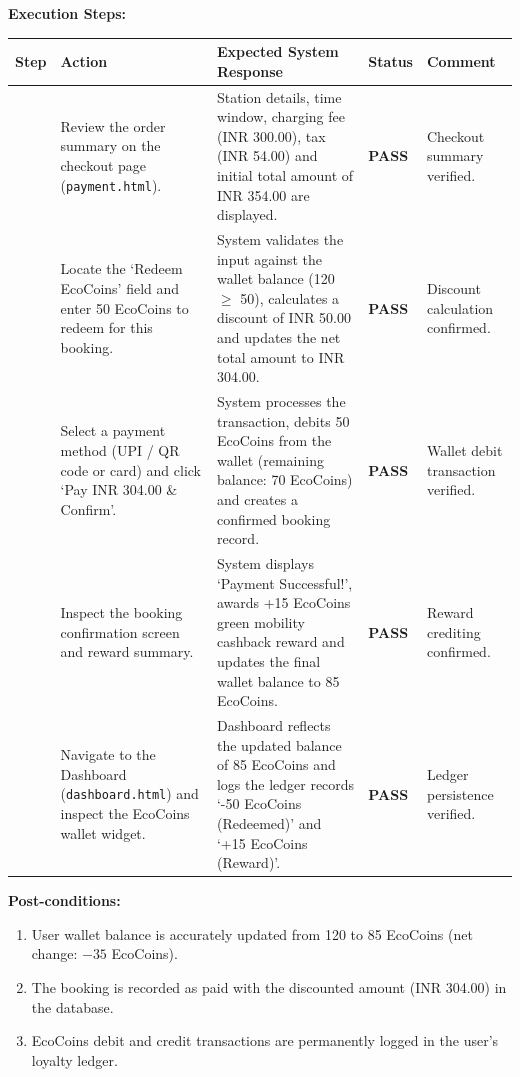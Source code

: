 \documentclass{tietreport}
\begin{document}
\vspace{-0.4em}
\noindent\textbf{Execution Steps:}
\begin{center}
\footnotesize
\renewcommand{\arraystretch}{1.02}
\setlength{\tabcolsep}{3pt}\begin{tabularx}{\textwidth}{|>{\centering\arraybackslash}p{0.9cm}|>{\raggedright\arraybackslash}p{3.3cm}|>{\raggedright\arraybackslash}X|>{\centering\arraybackslash}p{1.1cm}|>{\centering\arraybackslash\scriptsize}p{2.3cm}|}
\hline
\textbf{Step} & \textbf{Action} & \textbf{Expected System Response} & \textbf{Status} & \textbf{Comment} \\
\hline
1 & Review the order summary on the checkout page (\texttt{payment.html}). & Station details, time window, charging fee (INR 300.00), tax (INR 54.00) and initial total amount of INR 354.00 are displayed. & \textbf{PASS} & {\scriptsize Checkout summary verified.} \\
\hline
2 & Locate the `Redeem EcoCoins' field and enter 50 EcoCoins to redeem for this booking. & System validates the input against the wallet balance (120 $\geq$ 50), calculates a discount of INR 50.00 and updates the net total amount to INR 304.00. & \textbf{PASS} & {\scriptsize Discount calculation confirmed.} \\
\hline
3 & Select a payment method (UPI / QR code or card) and click `Pay INR 304.00 \& Confirm'. & System processes the transaction, debits 50 EcoCoins from the wallet (remaining balance: 70 EcoCoins) and creates a confirmed booking record. & \textbf{PASS} & {\scriptsize Wallet debit transaction verified.} \\
\hline
4 & Inspect the booking confirmation screen and reward summary. & System displays `Payment Successful!', awards +15 EcoCoins green mobility cashback reward and updates the final wallet balance to 85 EcoCoins. & \textbf{PASS} & {\scriptsize Reward crediting confirmed.} \\
\hline
5 & Navigate to the Dashboard (\texttt{dashboard.html}) and inspect the EcoCoins wallet widget. & Dashboard reflects the updated balance of 85 EcoCoins and logs the ledger records `-50 EcoCoins (Redeemed)' and `+15 EcoCoins (Reward)'. & \textbf{PASS} & {\scriptsize Ledger persistence verified.} \\
\hline
\end{tabularx}
\end{center}

\vspace{-0.4em}
\noindent\textbf{Post-conditions:}
\begin{enumerate}\footnotesize
    \setlength{\itemsep}{1pt}
    \setlength{\parskip}{0pt}
    \item User wallet balance is accurately updated from 120 to 85 EcoCoins (net change: $-35$ EcoCoins).
    \item The booking is recorded as paid with the discounted amount (INR 304.00) in the database.
    \item EcoCoins debit and credit transactions are permanently logged in the user's loyalty ledger.
\end{enumerate}
\end{document}
